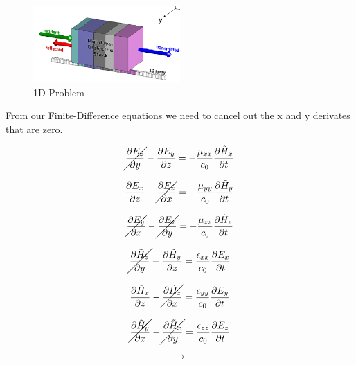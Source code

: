 \documentclass[a4paper,10pt]{article}
\begin{document}
\begin{figure}[h]
  \centering
    \includegraphics[width=0.5\textwidth]{Slabs1D.png}
  \caption{1D Problem}
\end{figure}


From our Finite-Difference equations we need to cancel out the x and y derivates that are zero.


\begin{equation*}
  \cancel{\frac{\partial E_z}{\partial y}} - \frac{\partial E_y}{\partial z} = -\frac{\mu_{xx}}{c_0}\frac{\partial\tilde{H}_x}{\partial t}
\end{equation*}

\begin{equation*}
  \frac{\partial E_x}{\partial z} - \cancel{\frac{\partial E_z}{\partial x}} = -\frac{\mu_{yy}}{c_0}\frac{\partial\tilde{H}_y}{\partial t}
\end{equation*}

\begin{equation*}
  \cancel{\frac{\partial E_y}{\partial x}} - \cancel{\frac{\partial E_x}{\partial y}} = -\frac{\mu_{zz}}{c_0}\frac{\partial\tilde{H}_z}{\partial t}
\end{equation*}

\begin{equation*}
  \cancel{\frac{\partial \tilde{H}_z}{\partial y}} - \frac{\partial \tilde{H}_y}{\partial z} = \frac{\epsilon_{xx}}{c_0}\frac{\partial E_x}{\partial t}
\end{equation*}

\begin{equation*}
  \frac{\partial \tilde{H}_x}{\partial z} - \cancel{\frac{\partial \tilde{H}_z}{\partial x}} = \frac{\epsilon_{yy}}{c_0}\frac{\partial E_y}{\partial t}
\end{equation*}

\begin{equation*}
  \cancel{\frac{\partial \tilde{H}_y}{\partial x}} - \cancel{\frac{\partial \tilde{H}_x}{\partial y}} = \frac{\epsilon_{zz}}{c_0}\frac{\partial E_z}{\partial t}
\end{equation*}

\[\longrightarrow\]
\end{document}
